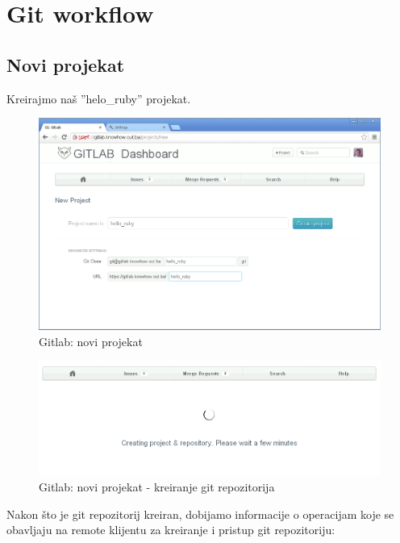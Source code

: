 \documentclass[times, utf8, seminar]{fit}
\begin{document}
\section{Git workflow}

\subsection{Novi projekat}

Kreirajmo naš ''helo\_ruby'' projekat.

\begin{figure}[H]
\centering
\includegraphics[width=15cm]{img/gitlab_new_project.png}
\caption{Gitlab: novi projekat}
\end{figure}


\begin{figure}[H]
\centering
\includegraphics[width=15cm]{img/gitlab_new_project_2.png}
\caption{Gitlab: novi projekat - kreiranje git repozitorija}
\end{figure}

Nakon što je git repozitorij kreiran, dobijamo informacije o operacijam koje se obavljaju na remote klijentu za kreiranje i pristup git repozitoriju:
\end{document}

